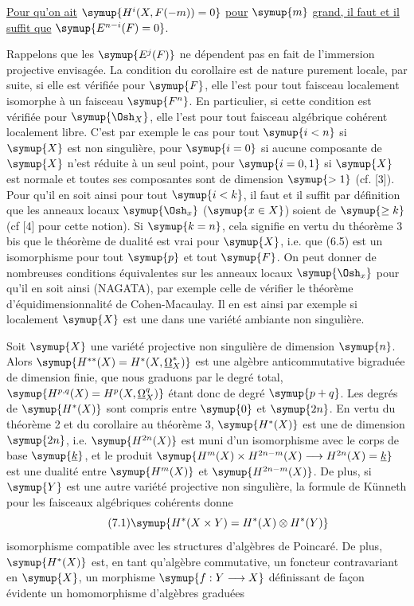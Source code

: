  \uline{Pour qu'on ait} $\symup{H^{i}(X,F(-m))=0}$ \uline{pour} $\symup{m}$ \uline{grand, il
faut et il suffit que} $\symup{E^{n-i}(F)=0}$.

Rappelons que les $\symup{E^{j}(F)}$ ne dépendent pas en fait de l'immersion projective
envisagée. La condition du corollaire est de nature purement locale, par suite,
si elle est vérifiée pour $\symup{F}$, elle l'est pour tout faisceau localement
isomorphe à un faisceau $\symup{F^{n}}$. En particulier, si cette condition est vérifiée
pour $\symup{\Osh_X}$, elle l'est pour tout faisceau algébrique cohérent localement
libre. C'est par exemple le cas pour tout $\symup{i<n}$ si $\symup{X}$ est non singulière, pour
$\symup{i=0}$ si aucune composante de $\symup{X}$ n'est réduite à un seul point, pour $\symup{i=0,1}$
si $\symup{X}$ est normale et toutes ses composantes sont de dimension $\symup{>1}$ (cf.
[3]). Pour qu'il en soit ainsi pour tout
$\symup{i<k}$, il faut et il suffit par définition que les anneaux locaux
$\symup{\Osh_x}$ ($\symup{x\in X}$) soient de  $\symup{\geq k}$ (cf [4]
pour cette notion). Si $\symup{k=n}$, cela signifie en vertu du théorème 3 bis que le
théorème de dualité est vrai pour $\symup{X}$, i.e. que (6.5) est un isomorphisme pour
tout $\symup{p}$ et tout $\symup{F}$. On peut donner de nombreuses conditions équivalentes sur
les anneaux locaux $\symup{\Osh_x}$ pour qu'il en soit ainsi (NAGATA), par exemple celle
de vérifier le théorème d'équidimensionnalité de Cohen-Macaulay. Il en est ainsi
par exemple si localement $\symup{X}$ est une  dans une
variété ambiante non singulière.


Soit $\symup{X}$ une variété projective non singulière de dimension $\symup{n}$. Alors
$\symup{H^{**}(X)=H^{*}(X,\underline{\Omega}_X^{*})}$ est une algèbre anticommutative bigraduée de dimension finie, que nous graduons
par le degré total, $\symup{H^{p,q}(X)=H^{p}(X,\underline{\Omega}_X^{q})}$ étant donc de degré
$\symup{p+q}$. Les degrés de $\symup{H^{*}(X)}$ sont compris entre $\symup{0}$ et $\symup{2n}$. En vertu du
théorème 2 et du corollaire au théorème 3, $\symup{H^{*}(X)}$ est une  de dimension $\symup{2n}$, i.e. $\symup{H^{2n}(X)}$ est muni d'un isomorphisme avec
le corps de base $\symup{\underline{k}}$, et le produit
$\symup{H^{m}(X)\times H^{2n-m}(X)\longrightarrow H^{2n}(X)=\underline{k}}$ est une dualité entre $\symup{H^{m}(X)}$ et $\symup{H^{2n-m}(X)}$. De plus, si $\symup{Y}$ est une
autre variété projective non singulière, la formule de Künneth pour les
faisceaux algébriques cohérents donne
\begin{equation}\tag{7.1}
  \symup{H^{*}(X\times Y)=H^{*}(X)\otimes H^{*}(Y)}
\end{equation}
isomorphisme compatible avec les structures d'algèbres de Poincaré. De plus,
$\symup{H^{*}(X)}$ est, en tant qu'algèbre commutative, un foncteur contravariant en
$\symup{X}$, un morphisme $\symup{f:Y\longrightarrow X}$ définissant de façon évidente un
homomorphisme d'algèbres graduées

